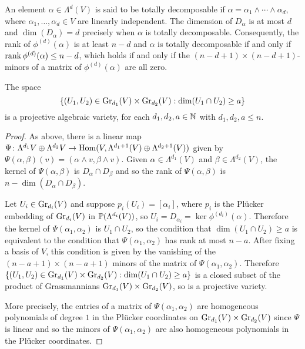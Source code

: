 \documentclass[a4paper, 11pt, twoside]{report}
\begin{document}
An element $\alpha\in\Lambda^d(V)$ is said to be totally decomposable if $\alpha = \alpha_1\wedge\cdots\wedge\alpha_d$, where $\alpha_1,\ldots,\alpha_d\in V$ are linearly independent. The dimension of $D_\alpha$ is at most $d$ and $\dim(D_\alpha)=d$ precisely when $\alpha$ is totally decomposable. Consequently, the rank of $\phi^{(d)}(\alpha)$ is at least $n-d$ and $\alpha$ is totally decomposable if and only if $\rank{\phi^{(d)}(\alpha)}\le n-d$, which holds if and only if the $(n-d+1)\times(n-d+1)$-minors of a matrix of $\phi^{(d)}(\alpha)$ are all zero.

\begin{lemma}\label{lemma:grassmannian-incidence-varieties}
The space
\begin{equation*}
\{(U_1,U_2)\in\GR[d_1]{V}\times\GR[d_2]{V}: \dim(U_1\cap U_2)\geq a\}
\end{equation*}
is a projective algebraic variety, for each $d_1,d_2,a\in\naturals$ with $d_1,d_2,a\le n$.
\end{lemma}

\begin{proof}
As above, there is a linear map $\Psi\colon\Lambda^{d_1}{V}\oplus\Lambda^{d_2}{V}\to\HOM(V,\Lambda^{d_1+1}(V)\oplus\Lambda^{d_2+1}(V))$ given by $\Psi(\alpha,\beta)(v) = (\alpha\wedge v,\beta\wedge v)$. Given $\alpha\in\Lambda^{d_1}(V)$ and $\beta\in\Lambda^{d_2}(V)$, the kernel of $\Psi(\alpha,\beta)$ is $D_\alpha\cap D_\beta$ and so the rank of $\Psi(\alpha,\beta)$ is $n-\dim(D_\alpha\cap D_\beta)$.

Let $U_i\in\GR[d_i]{V}$ and suppose $p_i(U_i)=[\alpha_i]$, where $p_i$ is the Pl\"ucker embedding of $\GR[d_i]{V}$ in $\Proj{(\Lambda^{d_i}(V))}$, so $U_i = D_{\alpha_i} = \ker{\phi^{(d_i)}(\alpha)}$. Therefore the kernel of $\Psi(\alpha_1,\alpha_2)$ is $U_1\cap U_2$, so the condition that $\dim(U_1\cap U_2)\geq a$ is equivalent to the condition that $\Psi(\alpha_1,\alpha_2)$ has rank at most $n-a$. After fixing a basis of $V$, this condition is given by the vanishing of the $(n-a+1)\times(n-a+1)$ minors of the matrix of $\Psi(\alpha_1,\alpha_2)$. Therefore $\{(U_1,U_2)\in\GR[d_1]{V}\times\GR[d_2]{V}:\dim(U_1\cap U_2)\geq a\}$ is a closed subset of the product of Grassmannians $\GR[d_1]{V}\times\GR[d_2]{V}$, so is a projective variety.

More precisely, the entries of a matrix of $\Psi(\alpha_1,\alpha_2)$ are homogeneous polynomials of degree $1$ in the Pl\"ucker coordinates on $\GR[d_1]{V}\times\GR[d_2]{V}$ since $\Psi$ is linear and so the minors of $\Psi(\alpha_1,\alpha_2)$ are also homogeneous polynomials in the Pl\"ucker coordinates.
\end{proof}
\end{document}
